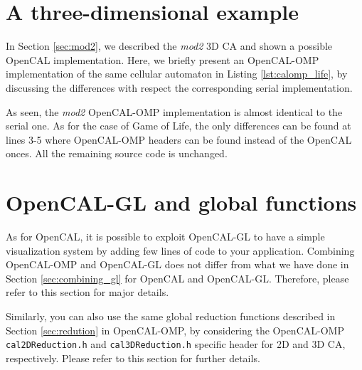 \section{A three-dimensional example}
In Section \ref{sec:mod2}, we described the \emph{mod2} 3D CA and
shown a possible OpenCAL implementation. Here, we briefly present an
OpenCAL-OMP implementation of the same cellular automaton in Listing
\ref{lst:calomp_life}, by discussing the differences with respect the
corresponding serial implementation.



As seen, the \emph{mod2} OpenCAL-OMP implementation is almost
identical to the serial one. As for the case of Game of Life, the only
differences can be found at lines 3-5 where OpenCAL-OMP headers can be
found instead of the OpenCAL onces. All the remaining source code is
unchanged.

\section{OpenCAL-GL and global functions}

As for OpenCAL, it is possible to exploit OpenCAL-GL to have a simple
visualization system by adding few lines of code to your
application. Combining OpenCAL-OMP and OpenCAL-GL does not differ from
what we have done in Section \ref{sec:combining_gl} for OpenCAL and
OpenCAL-GL. Therefore, please refer to this section for major details.

Similarly, you can also use the same global reduction functions
described in Section \ref{sec:redution} in OpenCAL-OMP, by considering
the OpenCAL-OMP \verb'cal2DReduction.h' and \verb'cal3DReduction.h'
specific header for 2D and 3D CA, respectively. Please refer to this
section for further details.
